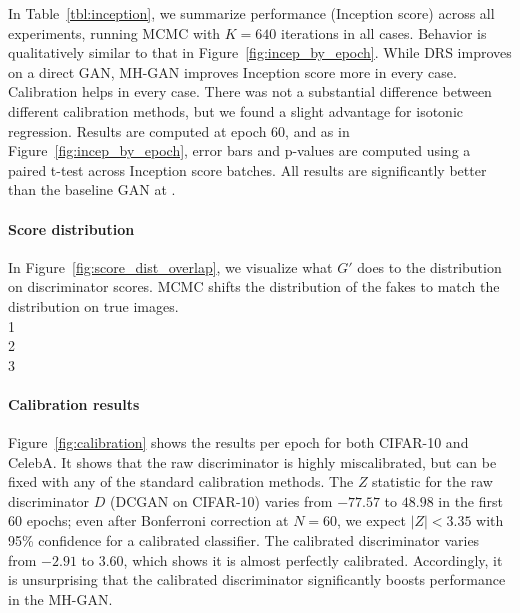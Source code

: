 \documentclass{article}
\begin{document}



In Table~\ref{tbl:inception}, we summarize performance (Inception score) across all experiments, running MCMC with $K=640$ iterations in all cases.
Behavior is qualitatively similar to that in Figure~\ref{fig:incep_by_epoch}.
While DRS improves on a direct GAN, MH-GAN improves Inception score more in every case.
Calibration helps in every case.
There was not a substantial difference between different calibration methods, but we found a slight advantage for isotonic regression.
Results are computed at epoch 60, and as in Figure~\ref{fig:incep_by_epoch}, error bars and p-values are computed using a paired t-test across Inception score batches.
All results are significantly better than the baseline GAN at .

\paragraph{Score distribution}
In Figure~\ref{fig:score_dist_overlap}, we visualize what $G'$ does to the distribution on discriminator scores.
MCMC shifts the distribution of the fakes to match the distribution on true images.\\
1\\ %
2\\
3

\paragraph{Calibration results}
Figure~\ref{fig:calibration} shows the results per epoch for both CIFAR-10 and CelebA\@.
It shows that the raw discriminator is highly miscalibrated, but can be fixed with any of the standard calibration methods.
The $Z$ statistic for the raw discriminator $D$ (DCGAN on CIFAR-10) varies from $-77.57$ to $48.98$ in the first 60 epochs; even after Bonferroni correction at $N \!\!=\!\! 60$, we expect $|Z| < 3.35$ with 95\% confidence for a calibrated classifier.
The calibrated discriminator varies from $-2.91$ to $3.60$, which shows it is almost perfectly calibrated.
Accordingly, it is unsurprising that the calibrated discriminator significantly boosts performance in the MH-GAN\@.
\end{document}
